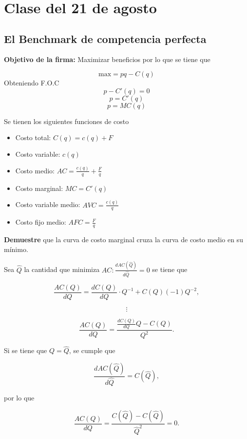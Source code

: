 \documentclass[letterpaper,12pt,twocolumn]{report}
\begin{document}
\section{Clase del 21 de agosto}

\subsection*{El Benchmark de competencia perfecta}

\textbf{Objetivo de la firma:} Maximizar beneficios por lo que se tiene que 

\begin{tcolorbox}[title=Precio en competencia perfecta]
    $$\text{max}=pq-C(q)$$
Obteniendo F.O.C
    $$ p-C'(q)=0 $$
    $$ p=C'(q)$$
    $$ p=MC(q) $$
\end{tcolorbox}

Se tienen los siguientes funciones de costo

\begin{itemize}
    \item Costo total: $C(q)=c(q)+F$
    \item Costo variable: $c(q)$
    \item Costo medio: $AC=\frac{c(q)}{q}+\frac{F}{q}$
    \item Costo marginal: $MC= C'(q)$
    \item Costo variable medio: $AVC=\frac{c(q)}{q}$
    \item Costo fijo medio: $AFC=\frac{F}{q}$
\end{itemize}





\textbf{Demuestre} que la curva de costo marginal cruza la curva de costo medio en su mínimo.

Sea $\hat{Q}$ la cantidad que minimiza $AC:\frac{dAC(\hat{Q})}{d\hat{Q}}=0$ se tiene que 

$$
\dfrac{AC(Q)}{dQ}= \frac{dC(Q)}{dQ}\cdot Q^{-1}+ C(Q)(-1)Q^{-2},
$$

$$ 
\vdots
$$

$$
\dfrac{AC(Q)}{dQ} = \dfrac{\frac{dC(Q)}{dQ}Q-C(Q)}{Q^{2}}.
$$

Si se tiene que $Q=\hat{Q}$, se cumple que 

$$ \frac{dAC(\hat{Q})}{d\hat{Q}}=C(\hat{Q}),$$

por lo que 

$$ \dfrac{AC(Q)}{dQ} = \dfrac{C(\hat{Q})-C(\hat{Q})}{\hat{Q}^{2}} = 0.$$
\end{document}
